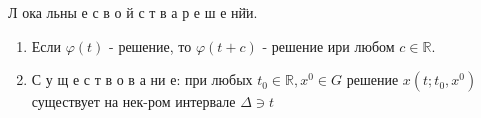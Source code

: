 \documentclass[10pt]{article}
\begin{document}
Л ока льны е с в о й с т в а р е ш е нй̈и.



\begin{enumerate}

  \item Если $\varphi(t)$ - решение, то $\varphi(t+c)$ - решение ири любом $c \in \mathbb{R}$.



  \item С у щ е с т в о в а ни е: при любых $t_{0} \in \mathbb{R}, x^{0} \in G$ решение $x\left(t ; t_{0}, x^{0}\right)$ существует на нек-ром интервале $\Delta \ni t$



\end{enumerate}
\end{document}
